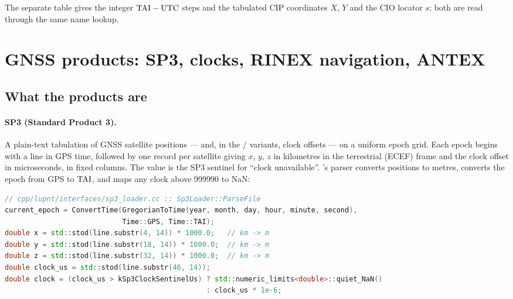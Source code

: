 The separate  table gives the integer $\mathrm{TAI}-\mathrm{UTC}$ steps and
 the tabulated CIP coordinates $X$, $Y$ and the CIO locator
$s$; both are read through the same  name lookup.

\section{GNSS products: SP3, clocks, RINEX navigation, ANTEX}
\label{sec:sp3-gnss}

\subsection{What the products are}
\label{sec:sp3-formats}

\paragraph{SP3 (Standard Product 3).} A plain-text tabulation of GNSS
satellite positions --- and, in the / variants, clock offsets
--- on a uniform epoch grid. Each epoch begins with a line
 in GPS time, followed by one
 record per satellite giving $x$, $y$, $z$ in kilometres in the
terrestrial (ECEF) frame and the clock offset in microseconds, in fixed
columns. The value  is the SP3 sentinel for
``clock unavailable''. \lupnt{}'s parser converts positions to metres,
converts the epoch from GPS to $\mathrm{TAI}$, and maps any clock above
\num{999990} to NaN:

\begin{lstlisting}[language=cpp, caption={SP3 record parsing.}, label={lst:sp3-parse}]
// cpp/lupnt/interfaces/sp3_loader.cc :: Sp3Loader::ParseFile
current_epoch = ConvertTime(GregorianToTime(year, month, day, hour, minute, second),
                            Time::GPS, Time::TAI);
double x = std::stod(line.substr(4, 14)) * 1000.0;   // km -> m
double y = std::stod(line.substr(18, 14)) * 1000.0;  // km -> m
double z = std::stod(line.substr(32, 14)) * 1000.0;  // km -> m
double clock_us = std::stod(line.substr(46, 14));
double clock = (clock_us > kSp3ClockSentinelUs) ? std::numeric_limits<double>::quiet_NaN()
                                                : clock_us * 1e-6;
\end{lstlisting}

